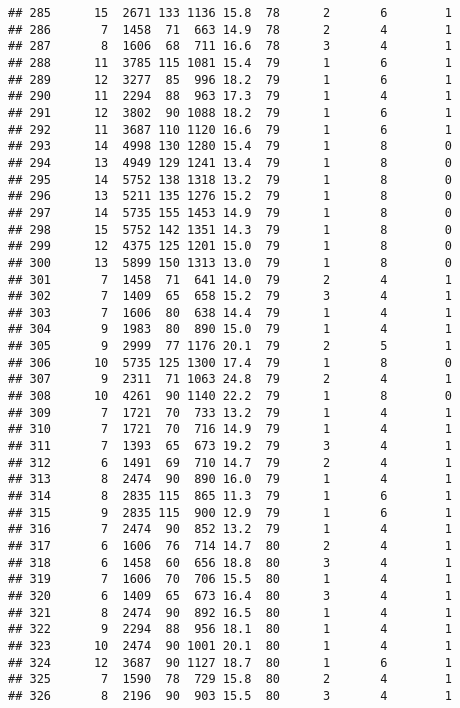 \documentclass{article}\usepackage[]{graphicx}\usepackage[]{color}
\makeatletter
\newenvironment{kframe}{%
 \def\at@end@of@kframe{}%
 \ifinner\ifhmode%
  \def\at@end@of@kframe{\end{minipage}}%
  \begin{minipage}{\columnwidth}%
 \fi\fi%
 \def\FrameCommand##1{\hskip\@totalleftmargin \hskip-\fboxsep
 \colorbox{shadecolor}{##1}\hskip-\fboxsep
     \hskip-\linewidth \hskip-\@totalleftmargin \hskip\columnwidth}%
 \MakeFramed {\advance\hsize-\width
   \@totalleftmargin\z@ \linewidth\hsize
   \@setminipage}}%
 {\par\unskip\endMakeFramed%
 \at@end@of@kframe}
\newenvironment{knitrout}{}{} %
\makeatother
\begin{document}
\begin{knitrout}
\begin{kframe}
\begin{verbatim}
## 285      15  2671 133 1136 15.8  78      2       6        1
## 286       7  1458  71  663 14.9  78      2       4        1
## 287       8  1606  68  711 16.6  78      3       4        1
## 288      11  3785 115 1081 15.4  79      1       6        1
## 289      12  3277  85  996 18.2  79      1       6        1
## 290      11  2294  88  963 17.3  79      1       4        1
## 291      12  3802  90 1088 18.2  79      1       6        1
## 292      11  3687 110 1120 16.6  79      1       6        1
## 293      14  4998 130 1280 15.4  79      1       8        0
## 294      13  4949 129 1241 13.4  79      1       8        0
## 295      14  5752 138 1318 13.2  79      1       8        0
## 296      13  5211 135 1276 15.2  79      1       8        0
## 297      14  5735 155 1453 14.9  79      1       8        0
## 298      15  5752 142 1351 14.3  79      1       8        0
## 299      12  4375 125 1201 15.0  79      1       8        0
## 300      13  5899 150 1313 13.0  79      1       8        0
## 301       7  1458  71  641 14.0  79      2       4        1
## 302       7  1409  65  658 15.2  79      3       4        1
## 303       7  1606  80  638 14.4  79      1       4        1
## 304       9  1983  80  890 15.0  79      1       4        1
## 305       9  2999  77 1176 20.1  79      2       5        1
## 306      10  5735 125 1300 17.4  79      1       8        0
## 307       9  2311  71 1063 24.8  79      2       4        1
## 308      10  4261  90 1140 22.2  79      1       8        0
## 309       7  1721  70  733 13.2  79      1       4        1
## 310       7  1721  70  716 14.9  79      1       4        1
## 311       7  1393  65  673 19.2  79      3       4        1
## 312       6  1491  69  710 14.7  79      2       4        1
## 313       8  2474  90  890 16.0  79      1       4        1
## 314       8  2835 115  865 11.3  79      1       6        1
## 315       9  2835 115  900 12.9  79      1       6        1
## 316       7  2474  90  852 13.2  79      1       4        1
## 317       6  1606  76  714 14.7  80      2       4        1
## 318       6  1458  60  656 18.8  80      3       4        1
## 319       7  1606  70  706 15.5  80      1       4        1
## 320       6  1409  65  673 16.4  80      3       4        1
## 321       8  2474  90  892 16.5  80      1       4        1
## 322       9  2294  88  956 18.1  80      1       4        1
## 323      10  2474  90 1001 20.1  80      1       4        1
## 324      12  3687  90 1127 18.7  80      1       6        1
## 325       7  1590  78  729 15.8  80      2       4        1
## 326       8  2196  90  903 15.5  80      3       4        1

\end{verbatim}
\end{kframe}
\end{knitrout}
\end{document}
